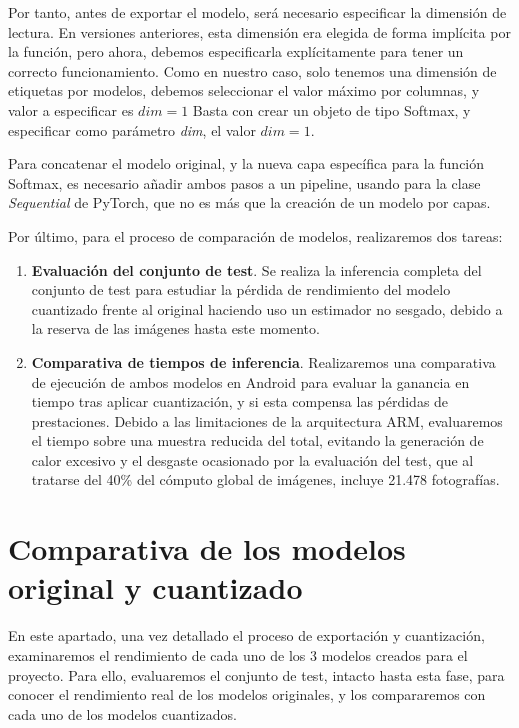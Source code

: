 Por tanto, antes de exportar el modelo, será necesario especificar la dimensión de lectura. En versiones anteriores, esta dimensión era elegida de forma implícita por la función, pero ahora, debemos especificarla explícitamente para tener un correcto funcionamiento. Como en nuestro caso, solo tenemos una dimensión de etiquetas por modelos, debemos seleccionar el valor máximo por columnas, y valor a especificar es $dim = 1$ Basta con crear un objeto de tipo Softmax, y especificar como parámetro \textit{dim}, el valor $dim = 1$.

Para concatenar el modelo original, y la nueva capa específica para la función Softmax, es necesario añadir ambos pasos a un pipeline, usando para la clase \textit{Sequential} de PyTorch, que no es más que la creación de un modelo por capas.

Por último, para el proceso de comparación de modelos, realizaremos dos tareas:
\begin{enumerate}
	\item \textbf{Evaluación del conjunto de test}. Se realiza la inferencia completa del conjunto de test para estudiar la pérdida de rendimiento del modelo cuantizado frente al original haciendo uso un estimador no sesgado, debido a la reserva de las imágenes hasta este momento.
	\item \textbf{Comparativa de tiempos de inferencia}. Realizaremos una comparativa de ejecución de ambos modelos en Android para evaluar la ganancia en tiempo tras aplicar cuantización, y si esta compensa las pérdidas de prestaciones. Debido a las limitaciones de la arquitectura ARM, evaluaremos el tiempo sobre una muestra reducida del total, evitando la generación de calor excesivo y el desgaste ocasionado por la evaluación del test, que al tratarse del 40\% del cómputo global de imágenes, incluye 21.478 fotografías.

\end{enumerate}

\section{Comparativa de los modelos original y cuantizado}

En este apartado, una vez detallado el proceso de exportación y cuantización, examinaremos el rendimiento de cada uno de los 3 modelos creados para el proyecto. Para ello, evaluaremos el conjunto de test, intacto hasta esta fase, para conocer el rendimiento real de los modelos originales, y los compararemos con cada uno de los modelos cuantizados.

